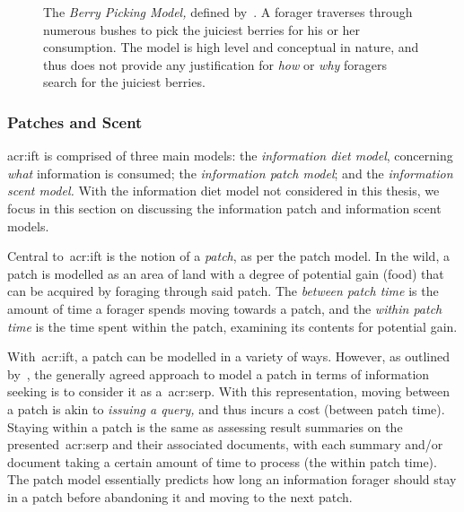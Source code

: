\begin{figure}[t!]
    \centering
    \caption[The Berry Picking Model~\cite{bates1989berry_picking}]{The \emph{Berry Picking Model,} defined by~\cite{bates1989berry_picking}. A forager traverses through numerous bushes to pick the juiciest berries for his or her consumption. The model is high level and conceptual in nature, and thus does not provide any justification for \emph{how} or \emph{why} foragers search for the juiciest berries.}
    \label{fig:berry_picking}
\end{figure}

\subsubsection{Patches and Scent}\label{sec:stopping_background:theoretical:ift:patch}
\gls{acr:ift} is comprised of three main models: the \emph{information diet model}, concerning \emph{what} information is consumed; the \emph{information patch model}; and the \emph{information scent model.} With the information diet model not considered in this thesis, we focus in this section on discussing the information patch and information scent models.

Central to~\gls{acr:ift} is the notion of a \emph{patch}, as per the patch model. In the wild, a patch is modelled as an area of land with a degree of potential gain (food) that can be acquired by foraging through said patch. The \emph{between patch time} is the amount of time a forager spends moving towards a patch, and the \emph{within patch time} is the time spent within the patch, examining its contents for potential gain.

With~\gls{acr:ift}, a patch can be modelled in a variety of ways. However, as outlined by~\cite{azzopardi2015theories}, the generally agreed approach to model a patch in terms of information seeking is to consider it as a~\gls{acr:serp}. With this representation, moving between a patch is akin to \emph{issuing a query,} and thus incurs a cost (between patch time). Staying within a patch is the same as assessing result summaries on the presented~\gls{acr:serp} and their associated documents, with each summary and/or document taking a certain amount of time to process (the within patch time). The patch model essentially predicts how long an information forager should stay in a patch before abandoning it and moving to the next patch.

